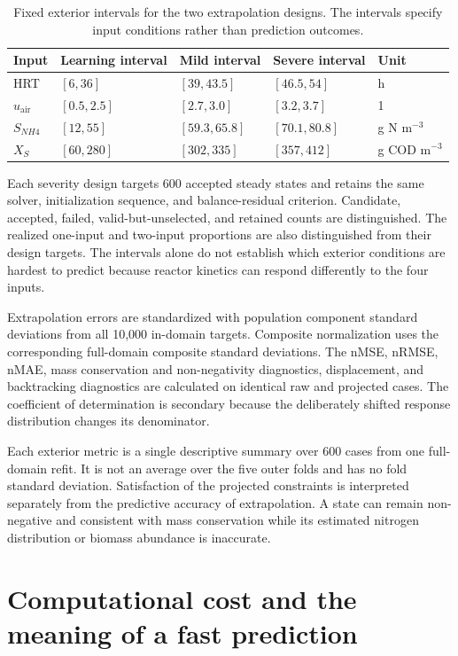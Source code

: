 \begin{table}[htbp]
\centering
\caption{Fixed exterior intervals for the two extrapolation designs. The intervals specify input conditions rather than prediction outcomes.}
\label{tab:reactor_extrapolation_domain}
\small
\begin{tabular}{lllll}
\toprule
Input & Learning interval & Mild interval & Severe interval & Unit\\
\midrule
HRT & $[6,36]$ & $[39,43.5]$ & $[46.5,54]$ & h\\
$u_{\mathrm{air}}$ & $[0.5,2.5]$ & $[2.7,3.0]$ & $[3.2,3.7]$ & 1\\
$S_{NH4}$ & $[12,55]$ & $[59.3,65.8]$ & $[70.1,80.8]$ & g N m$^{-3}$\\
$X_S$ & $[60,280]$ & $[302,335]$ & $[357,412]$ & g COD m$^{-3}$\\
\bottomrule
\end{tabular}
\end{table}

Each severity design targets 600 accepted steady states and retains the same solver, initialization sequence, and balance-residual criterion. Candidate, accepted, failed, valid-but-unselected, and retained counts are distinguished. The realized one-input and two-input proportions are also distinguished from their design targets. The intervals alone do not establish which exterior conditions are hardest to predict because reactor kinetics can respond differently to the four inputs.

Extrapolation errors are standardized with population component standard deviations from all 10,000 in-domain targets. Composite normalization uses the corresponding full-domain composite standard deviations. The nMSE, nRMSE, nMAE, mass conservation and non-negativity diagnostics, displacement, and backtracking diagnostics are calculated on identical raw and projected cases. The coefficient of determination is secondary because the deliberately shifted response distribution changes its denominator.

Each exterior metric is a single descriptive summary over 600 cases from one full-domain refit. It is not an average over the five outer folds and has no fold standard deviation. Satisfaction of the projected constraints is interpreted separately from the predictive accuracy of extrapolation. A state can remain non-negative and consistent with mass conservation while its estimated nitrogen distribution or biomass abundance is inaccurate.

\section{Computational cost and the meaning of a fast prediction}

